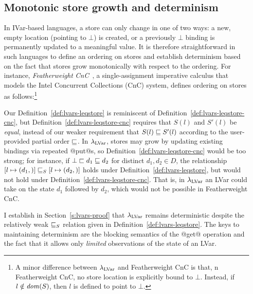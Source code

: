 \subsection{Monotonic store growth and determinism}\label{subsection:lvars-monotonic-store-growth}

In IVar-based languages, a store can only change in one of two ways: a
new, empty location (pointing to $\bot$) is created, or a previously
$\bot$ binding is permanently updated to a meaningful value.  It is
therefore straightforward in such languages to define an ordering on
stores and establish determinism based on the fact that stores grow
monotonically with respect to the ordering. For instance,
\emph{Featherweight CnC}~\cite{CnC}, a single-assignment imperative
calculus that models the Intel Concurrent Collections (CnC) system,
defines ordering on stores as follows:\footnote{A minor difference
  between $\lambda_{\textrm{LVar}}$ and Featherweight CnC is that, n Featherweight
  CnC, no store location is explicitly bound to $\bot$.  Instead, if
  $l \notin \mathit{dom}(S)$, then $l$ is defined to point to $\bot$.}

\LVarsDefLeqStoreCnC

Our Definition~\ref{def:lvars-leqstore} is reminiscent of
Definition~\ref{def:lvars-leqstore-cnc}, but
Definition~\ref{def:lvars-leqstore-cnc} requires that $S(l)$ and
$S'(l)$ be \emph{equal}, instead of our weaker requirement that $S(l)
\sqsubseteq S'(l)$ according to the user-provided partial order
$\sqsubseteq$.  In $\lambda_{\textrm{LVar}}$, stores may grow by updating existing
bindings via repeated @put@s, so
Definition~\ref{def:lvars-leqstore-cnc} would be too strong; for
instance, if $\bot \sqsubset d_1 \sqsubseteq d_2$ for distinct $d_1, d_2
\in D$, the relationship
$\left[ l \mapsto (d_1, \right)] \sqsubseteq_S \left[ l \mapsto (d_2, \right)]$
holds under Definition~\ref{def:lvars-leqstore}, but would not hold
under Definition~\ref{def:lvars-leqstore-cnc}.  That is, in
$\lambda_{\textrm{LVar}}$ an LVar could take on the state $d_1$ followed by $d_2$,
which would not be possible in Featherweight CnC.

I establish in Section~\ref{s:lvars-proof} that $\lambda_{\textrm{LVar}}$ remains
deterministic despite the relatively weak $ \sqsubseteq_S $ relation
given in Definition~\ref{def:lvars-leqstore}.  The keys to maintaining
determinism are the blocking semantics of the @get@ operation and the
fact that it allows only \emph{limited} observations of the state of
an LVar.
